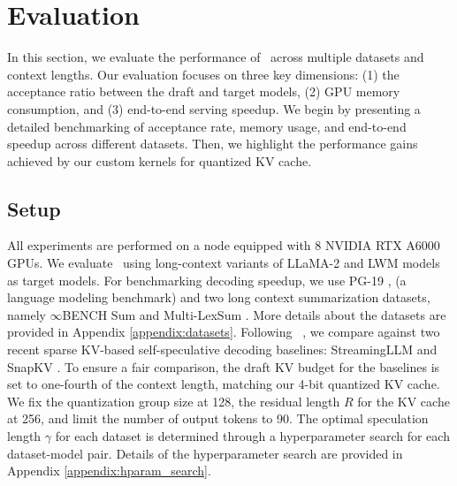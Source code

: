\section{Evaluation}
\label{sec:results}
In this section, we evaluate the performance of \OURS\ across multiple datasets and context lengths. Our evaluation focuses on three key dimensions: (1) the acceptance ratio between the draft and target models, (2) GPU memory consumption, and (3) end-to-end serving speedup. We begin by presenting a detailed benchmarking of acceptance rate, memory usage, and end-to-end speedup across different datasets. Then, we highlight the performance gains achieved by our custom kernels for quantized KV cache. 

\subsection{Setup}
All experiments are performed on a node equipped with 8 NVIDIA RTX A6000 GPUs. We evaluate \OURS\ using long-context variants of LLaMA-2 and LWM models as target models. For benchmarking decoding speedup, we use PG-19 \cite{raecompressive2019pg19}, 
(a language modeling benchmark)
and two long context summarization datasets, namely $\infty$B{\scriptsize ENCH} Sum \cite{zhang2024inftybenchextendinglongcontext, yen2024helmet} and Multi-LexSum \cite{shen2022multilexsum, yen2024helmet}. More details about the datasets are provided in Appendix \ref{appendix:datasets}. Following ~\citet{magicdec}, we compare against two recent sparse KV-based self-speculative decoding baselines: StreamingLLM \cite{magicdec, xiao2023streamingllm} and SnapKV \cite{magicdec, li2024snapkv}. To ensure a fair comparison, the draft KV budget for the baselines is set to one-fourth of the context length, matching our 4-bit quantized KV cache. We fix the quantization group size at 128, the residual length $R$ for the KV cache at 256, and limit the number of output tokens to 90. The optimal speculation length $\gamma$ for each dataset is determined through a hyperparameter search for each dataset-model pair. Details of the hyperparameter search are provided in Appendix \ref{appendix:hparam_search}.
 

